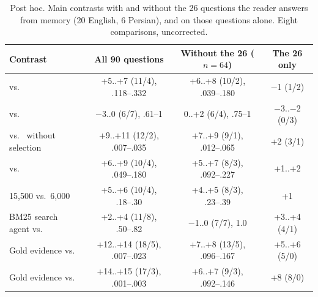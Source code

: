 \begin{table}[t]
\centering
\small
\setlength{\tabcolsep}{5pt}
\begin{tabular}{@{}lccc@{}}
\toprule
Contrast & All 90 questions & Without the 26 ($n=64$) & The 26 only \\
\midrule
\lexb{} vs.\ \hybrid{} & +5..+7 (11/4), .118--.332 & +6..+8 (10/2), .039--.180 & $-$1 (1/2) \\
\lexb{} vs.\ \hr{} & $-$3..0 (6/7), .61--1 & 0..+2 (6/4), .75--1 & $-$3..$-$2 (0/3) \\
\lexb{} vs.\ \lexb{} without selection & +9..+11 (12/2), .007--.035 & +7..+9 (9/1), .012--.065 & +2 (3/1) \\
\hr{} vs.\ \hybrid{} & +6..+9 (10/4), .049--.180 & +5..+7 (8/3), .092--.227 & +1..+2 \\
\hybrid{} 15,500 vs.\ 6,000 & +5..+6 (10/4), .18--.30 & +4..+5 (8/3), .23--.39 & +1 \\
BM25 search agent vs.\ \hr{} & +2..+4 (11/8), .50--.82 & $-$1..0 (7/7), 1.0 & +3..+4 (4/1) \\
Gold evidence vs.\ \hr{} & +12..+14 (18/5), .007--.023 & +7..+8 (13/5), .096--.167 & +5..+6 (5/0) \\
Gold evidence vs.\ \lexb{} & +14..+15 (17/3), .001--.003 & +6..+7 (9/3), .092--.146 & +8 (8/0) \\
\bottomrule
\end{tabular}
\caption{Post hoc. Main contrasts with and without the 26 questions the reader answers from memory (20 English, 6 Persian), and on those questions alone. Eight comparisons, uncorrected.}
\label{tab:contam}
\end{table}
